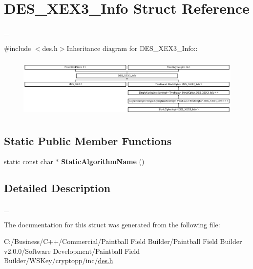 \hypertarget{struct_d_e_s___x_e_x3___info}{
\section{DES\_\-XEX3\_\-Info Struct Reference}
\label{struct_d_e_s___x_e_x3___info}
}


\_\-  


{\ttfamily \#include $<$des.h$>$}Inheritance diagram for DES\_\-XEX3\_\-Info::\begin{figure}[H]
\begin{center}
\leavevmode
\includegraphics[height=3.09392cm]{struct_d_e_s___x_e_x3___info}
\end{center}
\end{figure}
\subsection*{Static Public Member Functions}
\begin{DoxyCompactItemize}
\item 
\hypertarget{struct_d_e_s___x_e_x3___info_a53fec89e18d59da1c8eb33229b164c51}{
static const char $\ast$ {\bfseries StaticAlgorithmName} ()}
\label{struct_d_e_s___x_e_x3___info_a53fec89e18d59da1c8eb33229b164c51}

\end{DoxyCompactItemize}


\subsection{Detailed Description}
\_\- 

The documentation for this struct was generated from the following file:\begin{DoxyCompactItemize}
\item 
C:/Business/C++/Commercial/Paintball Field Builder/Paintball Field Builder v2.0.0/Software Development/Paintball Field Builder/WSKey/cryptopp/inc/\hyperlink{des_8h}{des.h}\end{DoxyCompactItemize}
